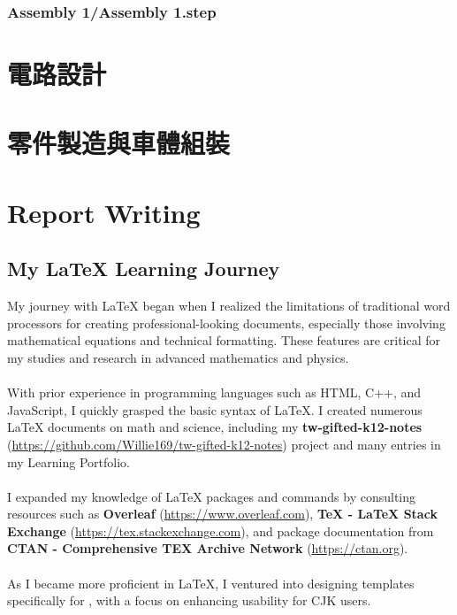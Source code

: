 \documentclass[a4paper,12pt]{article}
\begin{document}
\begin{lstlising}[language=C++]
\subsubsection{Assembly 1/Assembly 1.step}


\section{電路設計}

\section{零件製造與車體組裝}

\section{Report Writing}
\subsection{My \LaTeX{} Learning Journey}
My journey with \LaTeX{} began when I realized the limitations of traditional word processors for creating professional-looking documents, especially those involving mathematical equations and technical formatting. These features are critical for my studies and research in advanced mathematics and physics.\\\\
With prior experience in programming languages such as HTML, C++, and JavaScript, I quickly grasped the basic syntax of \LaTeX. I created numerous \LaTeX{} documents on math and science, including my \textbf{tw-gifted-k12-notes} (\href{https://github.com/Willie169/tw-gifted-k12-notes}{https://github.com/Willie169/tw-gifted-k12-notes}) project and many entries in my Learning Portfolio.\\\\
I expanded my knowledge of \LaTeX{} packages and commands by consulting resources such as \textbf{Overleaf} (\href{https://www.overleaf.com}{https://www.overleaf.com}), \textbf{TeX - LaTeX Stack Exchange} (\href{https://tex.stackexchange.com}{https://tex.stackexchange.com}), and package documentation from \textbf{CTAN - Comprehensive TEX Archive Network} (\href{https://ctan.org}{https://ctan.org}).\\\\
As I became more proficient in \LaTeX, I ventured into designing templates specifically for \XeTeX, with a focus on enhancing usability for CJK users.

\end{lstlising}
\end{document}
